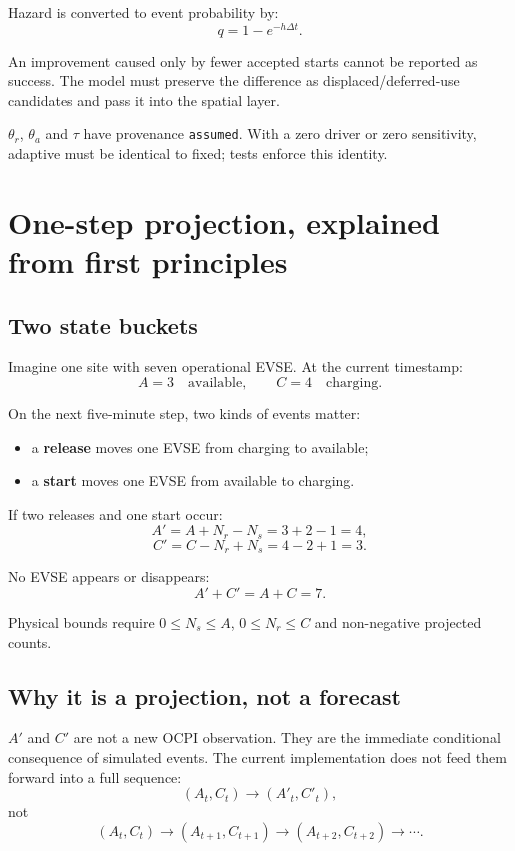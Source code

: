 \documentclass[11pt,a4paper]{article}
\newcommand{\term}[1]{\textbf{#1}}
\newcommand{\code}[1]{\texttt{#1}}
\begin{document}
Hazard is converted to event probability by:
\[
q=1-e^{-h\Delta t}.
\]

An improvement caused only by fewer accepted starts cannot be reported as success. The model must preserve the difference as displaced/deferred-use candidates and pass it into the spatial layer.

$\theta_r$, $\theta_a$ and $\tau$ have provenance \code{assumed}. With a zero driver or zero sensitivity, adaptive must be identical to fixed; tests enforce this identity.

\section{One-step projection, explained from first principles}

\subsection{Two state buckets}

Imagine one site with seven operational EVSE. At the current timestamp:
\[
A=3\quad\text{available},
\qquad
C=4\quad\text{charging}.
\]

On the next five-minute step, two kinds of events matter:
\begin{itemize}
\item a \term{release} moves one EVSE from charging to available;
\item a \term{start} moves one EVSE from available to charging.
\end{itemize}

If two releases and one start occur:
\[
A'=A+N_r-N_s=3+2-1=4,
\]
\[
C'=C-N_r+N_s=4-2+1=3.
\]

No EVSE appears or disappears:
\[
A'+C'=A+C=7.
\]

Physical bounds require $0\le N_s\le A$, $0\le N_r\le C$ and non-negative projected counts.

\subsection{Why it is a projection, not a forecast}

$A'$ and $C'$ are not a new OCPI observation. They are the immediate conditional consequence of simulated events. The current implementation does not feed them forward into a full sequence:
\[
(A_t,C_t)\longrightarrow(A'_t,C'_t),
\]
not
\[
(A_t,C_t)\to(A_{t+1},C_{t+1})\to(A_{t+2},C_{t+2})\to\cdots.
\]
\end{document}
